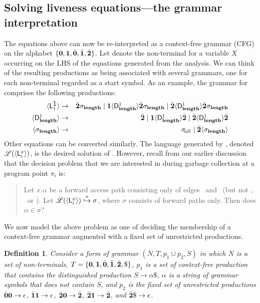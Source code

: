 \documentclass[9pt]{sigplanconf}
\newtheorem{definition}[theorem]{Definition}
\begin{document}
\subsection{Solving liveness equations---the grammar
interpretation}\label{sec:grammar-formulation}
The  equations above can now be re-interpreted as a
context-free grammar (CFG)  on the alphabet $\lbrace\mathbf{0}, \mathbf{1},
\bar{\mathbf{0}}, \bar{\mathbf{1}}, \bar{\mathbf{2}}\rbrace$.  Let   denote the non-terminal
for
a variable  $X$ occurring on  the LHS of the  equations generated
from the analysis.  We can  think of the resulting productions as
being associated with several  grammars, one for each non-terminal
 regarded as a start symbol.  As an example, the
grammar    for      comprises    the   following
productions:
 \begin{eqnarray*}
\var{\Lanv{1}{\xl}}  &\rightarrow&   \cbar\sigma_{\length} \mid \acdr \var{\Df
  {\length}{1}}{\cbar\sigma_{\length}} \mid
  \cbar\var{\Df{\length}{1}}{\cbar\sigma_{\length}} \\
  \var{\Df{\length}{1}} &\rightarrow& \cbar \mid
  \acdr\var{\Df{\length}{1}}\cbar 
       \mid \cbar\var{\Df{\length}{1}}{\cbar}\\
\langle {\sigma_{\length}} \rangle
&\rightarrow&
\sigma_{\!all}  \mid \cbar\langle{\sigma_{\length}}\rangle
\end{eqnarray*}
Other equations can be converted similarly.  The language generated by
,  denoted $\mathscr{L}(\var{\Lanv{i}{x}}) $,  is the
desired  solution of  .  However,  recall from  our earlier
discussion that the decision problem  that we are interested in during
garbage collection at a program point $\pi_i$ is:
\begin{quote}
Let  $x.\alpha$ be  a forward  access  path consisting  only of  edges
\acar\    and   \acdr\    (but    not   \bcar, \bcdr\ or \cbar).     Let
$\mathscr{L}(\var{\Lanv{i}{x}}) \stackrel{*}{\hookrightarrow} \sigma$,
where $\sigma$ consists  of forward paths only. Then  does $\alpha \in
\sigma$?
\end{quote}

We now model the above problem  as one of deciding the membership of a
context-free  grammar  augmented  with  a fixed  set  of  unrestricted
productions.

\begin{definition}\label{def:specialgrammar} 
Consider a form of  grammar $(N,T, p_1\cup p_2,S)$ in which $N$ is a set of
non-terminals, $T = \{\mathbf{0}, \mathbf{1}, \bar{\mathbf{0}}, \bar{\mathbf{1}}, \bar{\mathbf{2}}, \$\}$, $p_1$
is a set of context-free production that contains the distinguished
production $S \rightarrow \alpha\$$, $\alpha$ is a string of grammar
symbols that does not contain $S$, and $p_2$ is the fixed set of
unrestricted productions $\bar{\mathbf{0}}\mathbf{0} \rightarrow \epsilon$,
$\bar{\mathbf{1}}\mathbf{1} \rightarrow \epsilon$, $\bar{\mathbf{2}}\mathbf{0} \rightarrow \bar{\mathbf{2}}$,
$\bar{\mathbf{2}}\mathbf{1} \rightarrow \bar{\mathbf{2}}$, and $\bar{\mathbf{2}}\$ \rightarrow
\epsilon$. 
\end{definition}
\end{document}
